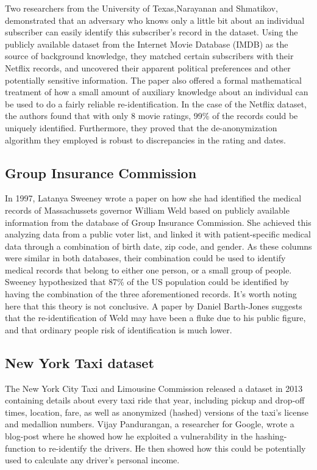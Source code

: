 Two researchers from the University of Texas,Narayanan and Shmatikov\cite{narayanan2008robust}, demonstrated that an adversary who knows only a little bit about an individual subscriber can easily identify this subscriber's record in the dataset. Using the publicly available dataset from the Internet Movie Database (IMDB) as the source of background knowledge, they matched certain subscribers with their Netflix records, and uncovered their apparent political preferences and other potentially sensitive information. The paper also offered a formal mathematical treatment of how a small amount of auxiliary knowledge about an individual can be used to do a fairly reliable re-identification. In the case of the Netflix dataset, the authors \cite{narayanan2008robust} found that with only 8 movie ratings, 99\% of the records could be uniquely identified. Furthermore, they proved that the de-anonymization algorithm they employed is robust to discrepancies in the rating and dates.

\subsection{Group Insurance Commission} \label{sec:GIC}
In 1997, Latanya Sweeney wrote a paper on how she had identified the medical records of Massachussets governor William Weld based on publicly available information from the database of Group Insurance Commission. She achieved this analyzing data from a public voter list, and linked it with patient-specific medical data through a combination of birth date, zip code, and gender\cite{sweeney2002k}. As these columns were similar in both databases, their combination could be used to identify medical records that belong to either one person, or a small group of people. Sweeney hypothesized that 87\% of the US population could be identified by having the combination of the three aforementioned records. It's worth noting here that this theory is not conclusive. A paper by Daniel Barth-Jones suggests that the re-identification of Weld may have been a fluke due to his public figure, and that ordinary people risk of identification is much lower\cite{barth2012re}. 

\subsection{New York Taxi dataset} 
The New York City Taxi and Limousine Commission released a dataset in 2013 containing details about every taxi ride that year, including pickup and drop-off times, location, fare, as well as anonymized (hashed) versions of the taxi's license and medallion numbers. Vijay Pandurangan, a researcher for Google, wrote a blog-post where he showed how he exploited a vulnerability in the hashing-function to re-identify the drivers. He then showed how this could be potentially used to calculate any driver's personal income\cite{vijay2014online}. 

